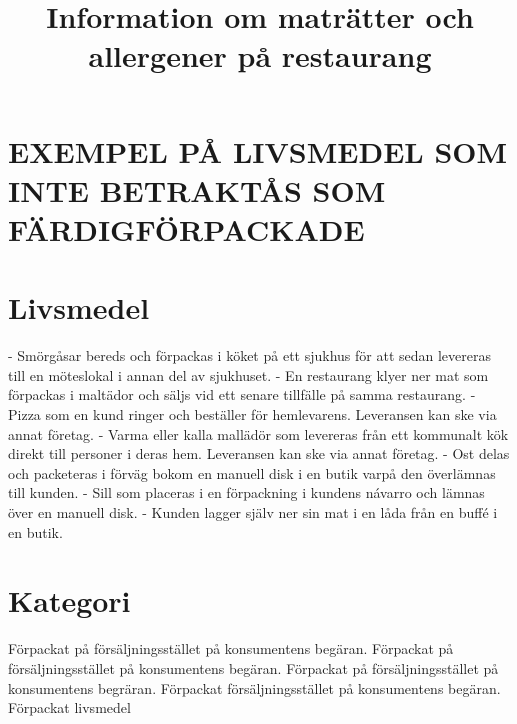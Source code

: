 \section*{EXEMPEL PÅ LIVSMEDEL SOM INTE BETRAKTÅS SOM FÄRDIGFÖRPACKADE}
\section*{Livsmedel}
- Smörgåsar bereds och förpackas i köket på ett sjukhus för att sedan levereras till en möteslokal i annan del av sjukhuset.
- En restaurang klyer ner mat som förpackas i maltädor och säljs vid ett senare tillfälle på samma restaurang.
- Pizza som en kund ringer och beställer för hemlevarens. Leveransen kan ske via annat företag.
- Varma eller kalla mallädör som levereras från ett kommunalt kök direkt till personer i deras hem. Leveransen kan ske via annat företag.
- Ost delas och packeteras i förväg bokom en manuell disk i en butik varpå den överlämnas till kunden.
- Sill som placeras i en förpackning i kundens návarro och lämnas över en manuell disk.
- Kunden lagger själv ner sin mat i en låda från en buffé i en butik.
\section*{Kategori}
Förpackat på försäljningsstället på konsumentens begäran.
Förpackat på försäljningsstället på konsumentens begäran.
Förpackat på försäljningsstället på konsumentens begräran.
Förpackat försäljningsstället på konsumentens begäran.
Förpackat livsmedel

\title{
Information om maträtter och allergener på restaurang
}